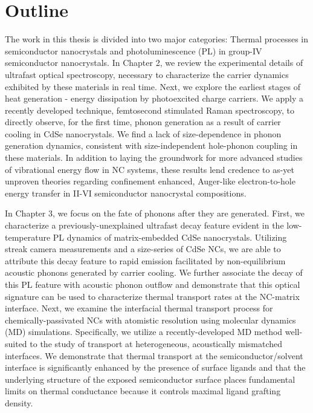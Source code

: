 \section{Outline}
The work in this thesis is divided into two major categories: Thermal processes in semiconductor nanocrystals and photoluminescence (PL) in group-IV semiconductor nanocrystals. In Chapter 2, we review the experimental details of ultrafast optical spectroscopy, necessary to characterize the carrier dynamics exhibited by these materials in real time. Next, we explore the earliest stages of heat generation - energy dissipation by photoexcited charge carriers. We apply a recently developed technique, femtosecond stimulated Raman spectroscopy, to directly observe, for the first time, phonon generation as a result of carrier cooling in CdSe nanocrystals. We find a lack of size-dependence in phonon generation dynamics, consistent with size-independent hole-phonon coupling in these materials. In addition to laying the groundwork for more advanced studies of vibrational energy flow in NC systems, these results lend credence to as-yet unproven theories regarding confinement enhanced, Auger-like electron-to-hole energy transfer in II-VI semiconductor nanocrystal compositions. \par
In Chapter 3, we focus on the fate of phonons after they are generated. First, we characterize a previously-unexplained ultrafast decay feature evident in the low-temperature PL dynamics of matrix-embedded CdSe nanocrystals. Utilizing streak camera measurements and a size-series of CdSe NCs, we are able to attribute this decay feature to rapid emission facilitated by non-equilibrium acoustic phonons generated by carrier cooling. We further associate the decay of this PL feature with acoustic phonon outflow and demonstrate that this optical signature can be used to characterize thermal transport rates at the NC-matrix interface. Next, we examine the interfacial thermal transport process for chemically-passivated NCs with atomistic resolution using molecular dynamics (MD) simulations. Specifically, we utilize a recently-developed MD method well-suited to the study of transport at heterogeneous, acoustically mismatched interfaces. We demonstrate that thermal transport at the semiconductor/solvent interface is significantly enhanced by the presence of surface ligands and that the underlying structure of the exposed semiconductor surface places fundamental limits on thermal conductance because it controls maximal ligand grafting density. \par
